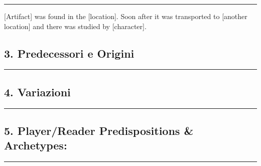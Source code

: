 \begin{center}\rule{0.5\linewidth}{0.5pt}\end{center}

{[}Artifact{]} was found in the {[}location{]}. Soon after it was
transported to {[}another location{]} and there was studied by
{[}character{]}.

\subsection{3. Predecessori e Origini}\label{predecessori-e-origini}

\begin{center}\rule{0.5\linewidth}{0.5pt}\end{center}

\subsection{4. Variazioni}\label{variazioni}

\begin{center}\rule{0.5\linewidth}{0.5pt}\end{center}

\subsection{5. Player/Reader Predispositions \&
Archetypes:}\label{playerreader-predispositions-archetypes}

\begin{center}\rule{0.5\linewidth}{0.5pt}\end{center}

